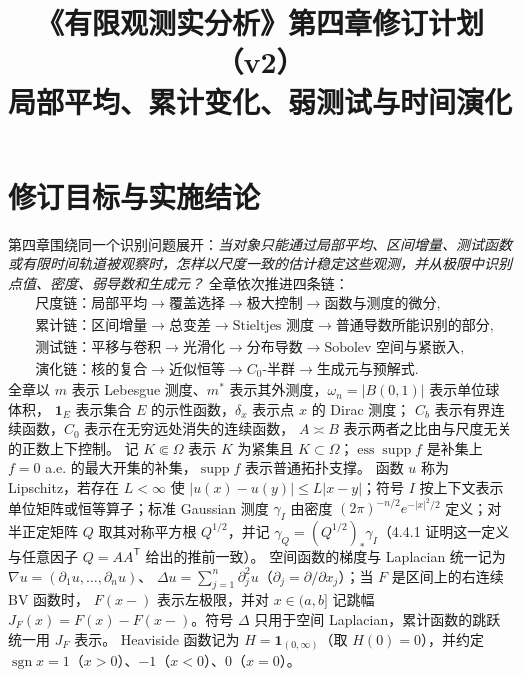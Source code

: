 \documentclass[11pt,a4paper]{ctexart}
\title{《有限观测实分析》第四章修订计划（v2）\\
\large 局部平均、累计变化、弱测试与时间演化}
\author{}
\date{}
\newcommand{\ess}{\operatorname*{ess}}
\newcommand{\supp}{\operatorname{supp}}
\begin{document}
\maketitle
\tableofcontents

\section{修订目标与实施结论}

第四章围绕同一个识别问题展开：\emph{当对象只能通过局部平均、区间增量、测试函数或有限时间轨道被观察时，怎样以尺度一致的估计稳定这些观测，并从极限中识别点值、密度、弱导数和生成元？}
全章依次推进四条链：
\[
\begin{aligned}
&\text{尺度链：局部平均}\longrightarrow\text{覆盖选择}\longrightarrow
  \text{极大控制}\longrightarrow\text{函数与测度的微分},\\
&\text{累计链：区间增量}\longrightarrow\text{总变差}\longrightarrow
  \text{Stieltjes 测度}\longrightarrow\text{普通导数所能识别的部分},\\
&\text{测试链：平移与卷积}\longrightarrow\text{光滑化}\longrightarrow
  \text{分布导数}\longrightarrow\text{Sobolev 空间与紧嵌入},\\
&\text{演化链：核的复合}\longrightarrow\text{近似恒等}\longrightarrow
  C_0\text{-半群}\longrightarrow\text{生成元与预解式}.
\end{aligned}
\]
全章以 $m$ 表示 Lebesgue 测度、$m^*$ 表示其外测度，$\omega_n=|B(0,1)|$ 表示单位球体积，
$\mathbf1_E$ 表示集合 $E$ 的示性函数，$\delta_x$ 表示点 $x$ 的 Dirac 测度；
$C_b$ 表示有界连续函数，$C_0$ 表示在无穷远处消失的连续函数，
$A\asymp B$ 表示两者之比由与尺度无关的正数上下控制。
记 $K\Subset\Omega$ 表示 $K$ 为紧集且 $K\subset\Omega$；$\ess\supp f$ 是补集上
$f=0$ a.e. 的最大开集的补集，$\supp f$ 表示普通拓扑支撑。
函数 $u$ 称为 Lipschitz，若存在 $L<\infty$ 使
$|u(x)-u(y)|\le L|x-y|$；符号 $I$ 按上下文表示单位矩阵或恒等算子；标准 Gaussian 测度 $\gamma_I$ 由密度
$(2\pi)^{-n/2}e^{-|x|^2/2}$ 定义；对半正定矩阵 $Q$ 取其对称平方根
$Q^{1/2}$，并记 $\gamma_Q=(Q^{1/2})_*\gamma_I$（4.4.1 证明这一定义与任意因子
$Q=AA^{\mathsf T}$ 给出的推前一致）。
空间函数的梯度与 Laplacian 统一记为
$\nabla u=(\partial_1u,\ldots,\partial_nu)$、
$\Delta u=\sum_{j=1}^n\partial_j^2u$（$\partial_j=\partial/\partial x_j$）；当 $F$ 是区间上的右连续 BV 函数时，
$F(x-)$ 表示左极限，并对 $x\in(a,b]$ 记跳幅
$J_F(x)=F(x)-F(x-)$。符号 $\Delta$ 只用于空间 Laplacian，累计函数的跳跃统一用 $J_F$ 表示。
Heaviside 函数记为 $H=\mathbf1_{(0,\infty)}$（取 $H(0)=0$），并约定
$\operatorname{sgn}x=1$（$x>0$）、$-1$（$x<0$）、$0$（$x=0$）。
\end{document}
